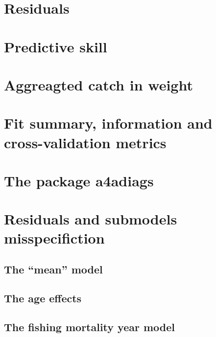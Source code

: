 \documentclass[
]{book}
\begin{document}
\hypertarget{residuals}{%
\section{Residuals}\label{residuals}}

\hypertarget{predictive-skill}{%
\section{Predictive skill}\label{predictive-skill}}

\hypertarget{aggreagted-catch-in-weight}{%
\section{Aggreagted catch in weight}\label{aggreagted-catch-in-weight}}

\hypertarget{fit-summary-information-and-cross-validation-metrics}{%
\section{Fit summary, information and cross-validation metrics}\label{fit-summary-information-and-cross-validation-metrics}}

\hypertarget{the-package-a4adiags}{%
\section{The package a4adiags}\label{the-package-a4adiags}}

\hypertarget{residuals-and-submodels-misspecifiction}{%
\section{Residuals and submodels misspecifiction}\label{residuals-and-submodels-misspecifiction}}

\hypertarget{the-mean-model}{%
\subsection{The ``mean'' model}\label{the-mean-model}}

\hypertarget{the-age-effects}{%
\subsection{The age effects}\label{the-age-effects}}

\hypertarget{the-fishing-mortality-year-model}{%
\subsection{The fishing mortality year model}\label{the-fishing-mortality-year-model}}
\end{document}
